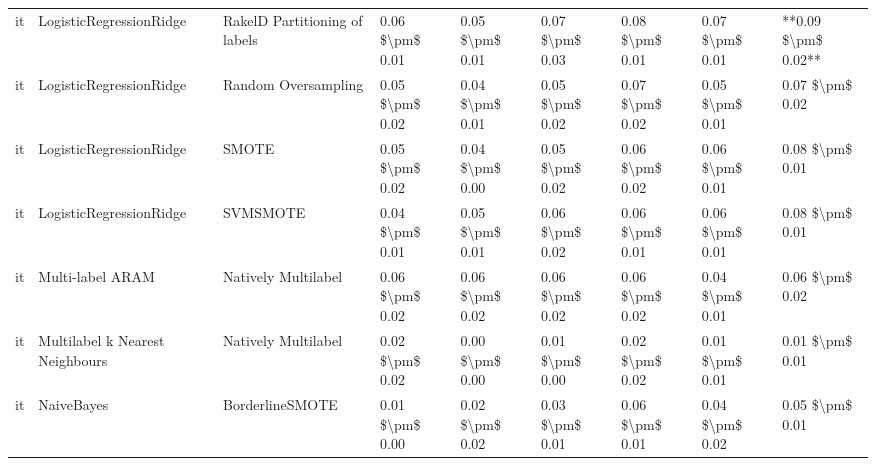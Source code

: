 \begin{tabular}{lllllllll}
      it &         LogisticRegressionRidge & RakelD Partitioning of labels & 0.06 \$\textbackslash pm\$ 0.01 &           0.05 \$\textbackslash pm\$ 0.01 &       0.07 \$\textbackslash pm\$ 0.03 &        0.08 \$\textbackslash pm\$ 0.01 &                         0.07 \$\textbackslash pm\$ 0.01 & **0.09 \$\textbackslash pm\$ 0.02** \\
      it &         LogisticRegressionRidge &           Random Oversampling & 0.05 \$\textbackslash pm\$ 0.02 &           0.04 \$\textbackslash pm\$ 0.01 &       0.05 \$\textbackslash pm\$ 0.02 &        0.07 \$\textbackslash pm\$ 0.02 &                         0.05 \$\textbackslash pm\$ 0.01 &     0.07 \$\textbackslash pm\$ 0.02 \\
      it &         LogisticRegressionRidge &                         SMOTE & 0.05 \$\textbackslash pm\$ 0.02 &           0.04 \$\textbackslash pm\$ 0.00 &       0.05 \$\textbackslash pm\$ 0.02 &        0.06 \$\textbackslash pm\$ 0.02 &                         0.06 \$\textbackslash pm\$ 0.01 &     0.08 \$\textbackslash pm\$ 0.01 \\
      it &         LogisticRegressionRidge &                      SVMSMOTE & 0.04 \$\textbackslash pm\$ 0.01 &           0.05 \$\textbackslash pm\$ 0.01 &       0.06 \$\textbackslash pm\$ 0.02 &        0.06 \$\textbackslash pm\$ 0.01 &                         0.06 \$\textbackslash pm\$ 0.01 &     0.08 \$\textbackslash pm\$ 0.01 \\
      it &                Multi-label ARAM &           Natively Multilabel & 0.06 \$\textbackslash pm\$ 0.02 &           0.06 \$\textbackslash pm\$ 0.02 &       0.06 \$\textbackslash pm\$ 0.02 &        0.06 \$\textbackslash pm\$ 0.02 &                         0.04 \$\textbackslash pm\$ 0.01 &     0.06 \$\textbackslash pm\$ 0.02 \\
      it & Multilabel k Nearest Neighbours &           Natively Multilabel & 0.02 \$\textbackslash pm\$ 0.02 &           0.00 \$\textbackslash pm\$ 0.00 &       0.01 \$\textbackslash pm\$ 0.00 &        0.02 \$\textbackslash pm\$ 0.02 &                         0.01 \$\textbackslash pm\$ 0.01 &     0.01 \$\textbackslash pm\$ 0.01 \\
      it &                      NaiveBayes &               BorderlineSMOTE & 0.01 \$\textbackslash pm\$ 0.00 &           0.02 \$\textbackslash pm\$ 0.02 &       0.03 \$\textbackslash pm\$ 0.01 &        0.06 \$\textbackslash pm\$ 0.01 &                         0.04 \$\textbackslash pm\$ 0.02 &     0.05 \$\textbackslash pm\$ 0.01 \\

\end{tabular}
